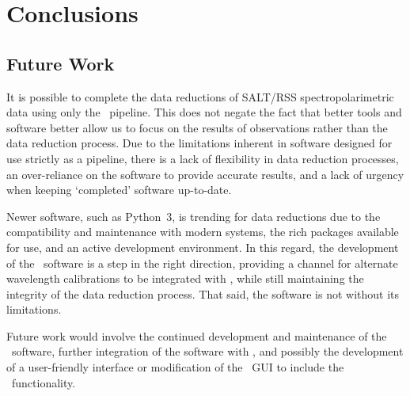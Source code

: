 \chapter{Conclusions} \label{ch:05}



\section{Future Work}

It is possible to complete the data reductions of \gls{SALT}/\gls{RSS} spectropolarimetric data using only the \polsalt\ pipeline.
This does not negate the fact that better tools and software better allow us to focus on the results of observations rather than the data reduction process.
Due to the limitations inherent in software designed for use strictly as a pipeline, there is a lack of flexibility in data reduction processes, an over-reliance on the software to provide accurate results, and a lack of urgency when keeping `completed' software up-to-date.

Newer software, such as Python~$3$, is trending for data reductions due to the compatibility and maintenance with modern systems, the rich packages available for use, and an active development environment.
In this regard, the development of the \stops\ software is a step in the right direction, providing a channel for alternate wavelength calibrations to be integrated with \polsalt, while still maintaining the integrity of the data reduction process.
That said, the software is not without its limitations.

Future work would involve the continued development and maintenance of the \stops\ software, further integration of the software with \polsalt, and possibly the development of a user-friendly interface or modification of the \polsalt\ \gls{GUI} to include the \stops\ functionality.


